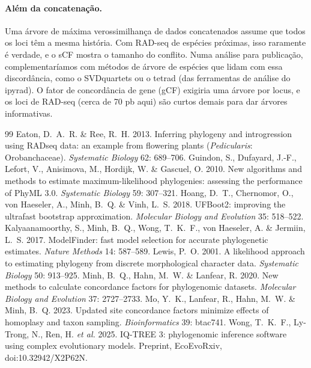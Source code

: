 \documentclass[11pt,a4paper]{article}
\begin{document}
\paragraph{Além da concatenação.} Uma árvore de máxima verossimilhança de dados concatenados
assume que todos os loci têm a mesma história. Com RAD-seq de espécies próximas, isso raramente
é verdade, e o sCF mostra o tamanho do conflito. Numa análise para publicação, complementaríamos
com métodos de árvore de espécies que lidam com essa discordância, como o SVDquartets ou o
tetrad (das ferramentas de análise do ipyrad). O fator de concordância de gene (gCF) exigiria
uma árvore por locus, e os loci de RAD-seq (cerca de 70 pb aqui) são curtos demais para dar
árvores informativas.

\begin{thebibliography}{99}
 Eaton, D.~A.~R. \& Ree, R.~H. 2013. Inferring phylogeny and introgression
using RADseq data: an example from flowering plants (\emph{Pedicularis}: Orobanchaceae).
\emph{Systematic Biology} 62: 689--706.
 Guindon, S., Dufayard, J.-F., Lefort, V., Anisimova, M., Hordijk, W. \&
Gascuel, O. 2010. New algorithms and methods to estimate maximum-likelihood phylogenies:
assessing the performance of PhyML 3.0. \emph{Systematic Biology} 59: 307--321.
 Hoang, D.~T., Chernomor, O., von Haeseler, A., Minh, B.~Q. \& Vinh, L.~S.
2018. UFBoot2: improving the ultrafast bootstrap approximation. \emph{Molecular Biology and
Evolution} 35: 518--522.
 Kalyaanamoorthy, S., Minh, B.~Q., Wong, T.~K.~F., von Haeseler, A.
\& Jermiin, L.~S. 2017. ModelFinder: fast model selection for accurate phylogenetic estimates.
\emph{Nature Methods} 14: 587--589.
 Lewis, P.~O. 2001. A likelihood approach to estimating phylogeny from
discrete morphological character data. \emph{Systematic Biology} 50: 913--925.
 Minh, B.~Q., Hahn, M.~W. \& Lanfear, R. 2020. New methods to calculate
concordance factors for phylogenomic datasets. \emph{Molecular Biology and Evolution} 37:
2727--2733.
 Mo, Y.~K., Lanfear, R., Hahn, M.~W. \& Minh, B.~Q. 2023. Updated site
concordance factors minimize effects of homoplasy and taxon sampling. \emph{Bioinformatics} 39:
btac741.
 Wong, T.~K.~F., Ly-Trong, N., Ren, H. \emph{et al.} 2025. IQ-TREE 3:
phylogenomic inference software using complex evolutionary models. Preprint, EcoEvoRxiv,
doi:10.32942/X2P62N.
\end{thebibliography}
\end{document}
